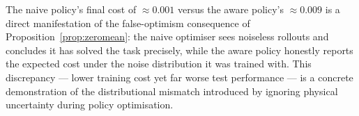 The naive policy's final cost of $\approx 0.001$ versus the aware policy's
$\approx 0.009$ is a direct manifestation of the false-optimism consequence of
Proposition~\ref{prop:zeromean}: the naive optimiser sees noiseless rollouts and
concludes it has solved the task precisely, while the aware policy honestly reports
the expected cost under the noise distribution it was trained with.
This discrepancy — lower training cost yet far worse test performance — is
a concrete demonstration of the distributional mismatch introduced by ignoring
physical uncertainty during policy optimisation.
